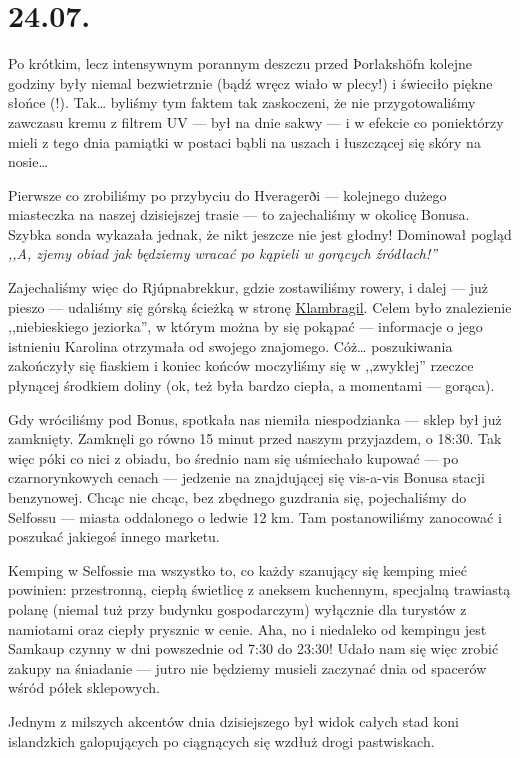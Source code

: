 \chapter*{24.07.}

Po krótkim, lecz intensywnym porannym deszczu przed Þorlakshöfn kolejne godziny były niemal bezwietrznie (bądź wręcz wiało w plecy!) i świeciło piękne słońce (!). Tak… byliśmy tym faktem tak zaskoczeni, że nie przygotowaliśmy zawczasu kremu z filtrem UV --- był na dnie sakwy --- i w efekcie co poniektórzy mieli z tego dnia pamiątki w postaci bąbli na uszach i łuszczącej się skóry na nosie…


Pierwsze co zrobiliśmy po przybyciu do Hveragerði --- kolejnego dużego miasteczka na naszej dzisiejszej trasie --- to zajechaliśmy w okolicę Bonusa. Szybka sonda wykazała jednak, że nikt jeszcze nie jest głodny! Dominował pogląd \emph{,,A, zjemy obiad jak będziemy wracać po kąpieli w gorących źródłach!''}

Zajechaliśmy więc do Rjúpnabrekkur, gdzie zostawiliśmy rowery, i dalej --- już pieszo --- udaliśmy się górską ścieżką w stronę \href{http://www.vulkaner.no/t/isl2004/hot.html}{Klambragil}. Celem było znalezienie ,,niebieskiego jeziorka'', w którym można by się pokąpać --- informacje o jego istnieniu Karolina otrzymała od swojego znajomego. Cóż… poszukiwania zakończyły się fiaskiem i koniec końców moczyliśmy się w ,,zwykłej'' rzeczce płynącej środkiem doliny (ok, też była bardzo ciepła, a momentami --- gorąca).


Gdy wróciliśmy pod Bonus, spotkała nas niemiła niespodzianka --- sklep był już zamknięty. Zamknęli go równo 15 minut przed naszym przyjazdem, o 18:30. Tak więc póki co nici z obiadu, bo średnio nam się uśmiechało kupować --- po czarnorynkowych cenach --- jedzenie na znajdującej się vis-a-vis Bonusa stacji benzynowej. Chcąc nie chcąc, bez zbędnego guzdrania się, pojechaliśmy do Selfossu --- miasta oddalonego o ledwie 12 km. Tam postanowiliśmy zanocować i poszukać jakiegoś innego marketu.

Kemping w Selfossie ma wszystko to, co każdy szanujący się kemping mieć powinien: przestronną, ciepłą świetlicę z aneksem kuchennym, specjalną trawiastą polanę (niemal tuż przy budynku gospodarczym) wyłącznie dla turystów z namiotami oraz ciepły prysznic w cenie. Aha, no i niedaleko od kempingu jest Samkaup czynny w dni powszednie od 7:30 do 23:30! Udało nam się więc zrobić zakupy na śniadanie --- jutro nie będziemy musieli zaczynać dnia od spacerów wśród półek sklepowych.

Jednym z milszych akcentów dnia dzisiejszego był widok całych stad koni islandzkich galopujących po ciągnących się wzdłuż drogi pastwiskach.